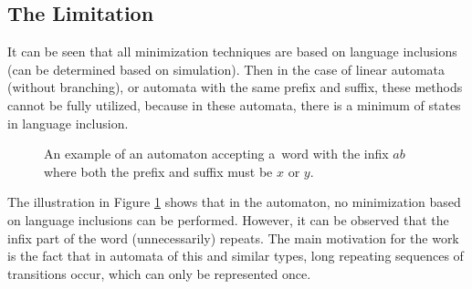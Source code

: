     \subsection{The Limitation}
        It can be seen that all minimization techniques are based on language inclusions (can be determined based on simulation). Then in the case of linear automata (without branching), or automata with the same prefix and suffix, these methods cannot be fully utilized, because in these automata, there is a minimum of states in language inclusion.

        \begin{figure}[h]
            \centering
            \captionsetup{justification=justified}
            \caption{An example of an automaton accepting a~word with the infix $ab$ where both the prefix and suffix must be $x$ or $y$.}
            \label{sufprefAtm}
          \end{figure}

          The illustration in Figure \ref{sufprefAtm} shows that in the automaton, no minimization based on language inclusions can be performed. However, it can be observed that the infix part of the word (unnecessarily) repeats. The main motivation for the work is the fact that in automata of this and similar types, long repeating sequences of transitions occur, which can only be represented once.

